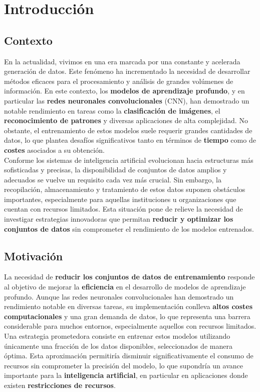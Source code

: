 \chapter{Introducción}\label{ch:introduccion}

\section{Contexto}\label{sec:contexto}
En la actualidad, vivimos en una era marcada por una constante y acelerada generación de datos.
Este fenómeno ha incrementado la necesidad de desarrollar métodos eficaces para el procesamiento y análisis de grandes
volúmenes de información.
En este contexto, los \textbf{modelos de aprendizaje profundo}, y en particular las
\textbf{redes neuronales convolucionales} (CNN), han demostrado un notable rendimiento en tareas como la
\textbf{clasificación de imágenes}, el \textbf{reconocimiento de patrones} y diversas aplicaciones de alta complejidad.
No obstante, el entrenamiento de estos modelos suele requerir grandes cantidades de datos, lo que plantea desafíos
significativos tanto en términos de \textbf{tiempo} como de \textbf{costes} asociados a su obtención. \\[6pt]


Conforme los sistemas de inteligencia artificial evolucionan hacia estructuras más sofisticadas y precisas, la
disponibilidad de conjuntos de datos amplios y adecuados se vuelve un requisito cada vez más crucial.
Sin embargo, la recopilación, almacenamiento y tratamiento de estos datos suponen obstáculos importantes, especialmente
para aquellas instituciones u organizaciones que cuentan con recursos limitados.
Esta situación pone de relieve la necesidad de investigar estrategias innovadoras que permitan
\textbf{reducir y optimizar los conjuntos de datos} sin comprometer el rendimiento de los modelos entrenados. \\[6pt]


\section{Motivación}\label{sec:motivacion}
La necesidad de \textbf{reducir los conjuntos de datos de entrenamiento} responde al objetivo de mejorar la
\textbf{eficiencia} en el desarrollo de modelos de aprendizaje profundo.
Aunque las redes neuronales convolucionales han demostrado un rendimiento notable en diversas tareas, su implementación
conlleva \textbf{altos costes computacionales} y una gran demanda de datos, lo que representa una barrera considerable
para muchos entornos, especialmente aquellos con recursos limitados.
Una estrategia prometedora consiste en entrenar estos modelos utilizando únicamente una fracción de los datos
disponibles, seleccionados de manera óptima.
Esta aproximación permitiría disminuir significativamente el consumo de recursos sin comprometer la precisión del
modelo, lo que supondría un avance importante para la \textbf{inteligencia artificial}, en particular en aplicaciones
donde existen \textbf{restricciones de recursos}. \\[6pt]


